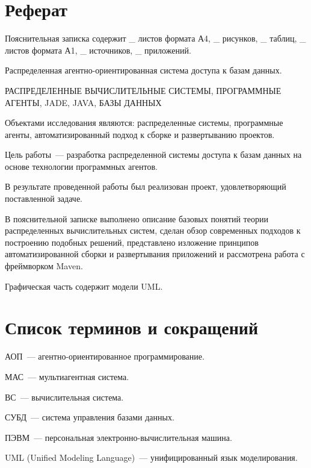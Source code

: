 \section*{Реферат}
Пояснительная записка содержит \_ листов формата А4, \_ рисунков, \_ таблиц, \_ листов формата А1, \_ источников, \_ приложений.

Распределенная агентно-ориентированная система доступа к базам данных.

РАСПРЕДЕЛЕННЫЕ ВЫЧИСЛИТЕЛЬНЫЕ СИСТЕМЫ, ПРОГРАММНЫЕ АГЕНТЫ, JADE, JAVA, БАЗЫ ДАННЫХ

Объектами исследования являются: распределенные системы, программные агенты, автоматизированный подход к сборке и развертыванию проектов.

Цель работы~--- разработка распределенной системы доступа к базам данных на основе технологии программных агентов.

В результате проведенной работы был реализован проект, удовлетворяющий поставленной задаче.

В пояснительной записке выполнено описание базовых понятий теории распределенных вычислительных систем, сделан обзор современных подходов к построению подобных решений,  представлено изложение принципов  автоматизированной сборки и развертывания приложений и рассмотрена работа с фреймворком Maven.

Графическая часть содержит модели UML.

\newpage
\section*{Список терминов и сокращений}
АОП~--- агентно-ориентированное программирование.

МАС~--- мультиагентная система.
 
ВС~--- вычислительная система.

СУБД~--- система управления базами данных.

ПЭВМ~--- персональная электронно-вычислительная машина.

UML (Unified Modeling Language)~--- унифицированный язык моделирования.
